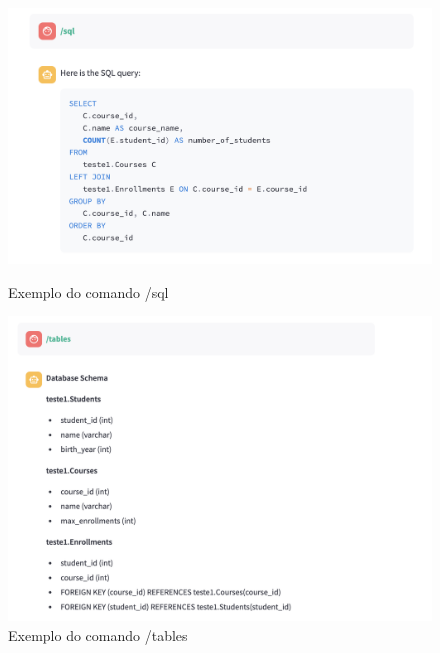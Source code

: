 \documentclass{article}
\begin{document}
\begin{figure}[!h]
    \begin{minipage}{0.46\linewidth}
        \centering
        \includegraphics[width=\linewidth]{images/sql.png}
        \caption{Exemplo do comando /sql}
        \label{fig:sql}
    \end{minipage}
    \hspace{0.01\linewidth} %
    \begin{minipage}{0.46\linewidth}
        \centering
        \includegraphics[width=\linewidth]{images/tables.png}
        \caption{Exemplo do comando /tables}
        \label{fig:tables}
    \end{minipage}

        \vspace{0.5cm} %


\end{figure}
\end{document}
